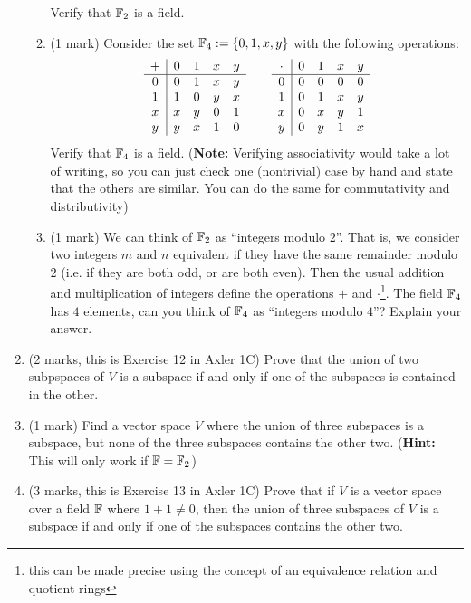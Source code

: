 \documentclass[12pt]{article}
\begin{document}
\begin{enumerate}
\begin{enumerate}
    Verify that $\mathbb{F}_2$ is a field.
  \item (1 mark) Consider the set $\mathbb{F}_4:=\{ 0,1,x, y\}$ with the following operations:
    \[
      \begin{array}[h]{c | c c c c }
        + & 0 & 1 & x & y \\
        \hline
        0 & 0 & 1 & x & y \\
        1 & 1 & 0 & y & x \\
        x & x & y & 0 & 1 \\
        y & y & x & 1 & 0
      \end{array}
      \qquad
      \begin{array}[h]{c | c c c c }
        \cdot & 0 & 1 & x & y \\
        \hline
        0 & 0 & 0 & 0 & 0 \\
        1 & 0 & 1 & x & y \\
        x & 0 & x & y & 1 \\
        y & 0 & y & 1 & x
      \end{array}      
    \]
    Verify that $\mathbb{F}_4$ is a field. (\textbf{Note:} Verifying associativity would take a lot of writing, so you can just check one (nontrivial) case by hand and state that the others are similar. You can do the same for commutativity and distributivity)
  \item (1 mark) We can think of $\mathbb{F}_2$ as ``integers modulo $2$''. That is, we consider two integers $m$ and $n$ equivalent if they have the same remainder modulo $2$ (i.e. if they are both odd, or are both even). Then the usual addition and multiplication of integers define the operations $+$ and $\cdot$\footnote{this can be made precise using the concept of an equivalence relation and quotient rings}. The field $\mathbb{F}_4$ has $4$ elements, can you think of $\mathbb{F}_4$ as ``integers modulo $4$''? Explain your answer.
  \end{enumerate}
\item (2 marks, this is Exercise 12 in Axler 1C) Prove that the union of two subpspaces of $V$ is a subspace if and only if one of the subspaces is contained in the other.
\item (1 mark) Find a vector space $V$ where the union of three subspaces is a subspace, but none of the three subspaces contains the other two. (\textbf{Hint:} This will only work if $\mathbb{F}=\mathbb{F}_2$)
\item (3 marks, this is Exercise 13 in Axler 1C) Prove that if $V$ is a vector space over a field $\mathbb{F}$ where $1+1\neq 0$, then the union of three subspaces of $V$ is a subspace if and only if one of the subspaces contains the other two.

\end{enumerate}
\end{document}
